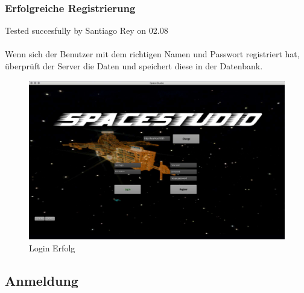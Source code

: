 \documentclass[12pt]{article}
\begin{document}
\subsubsection{Erfolgreiche Registrierung}
Tested succesfully by Santiago Rey on 02.08\\\\
Wenn sich der Benutzer mit dem richtigen Namen und Passwort registriert hat, überprüft der Server die Daten und speichert diese in der Datenbank.\\

\begin{figure}[h]
\centering
\includegraphics[scale=0.4]{TestProtocolBilder/erfolgLogin.jpg}
\caption{Login Erfolg}
\end{figure}
\newpage
\subsection{Anmeldung}
\end{document}
